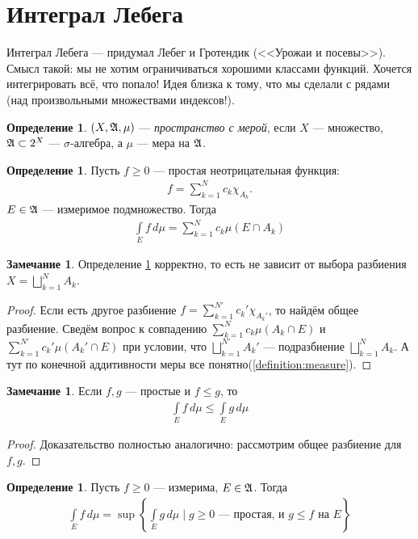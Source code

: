 \documentclass[a4paper,14pt]{extarticle}
\newcounter{theoremCnt}
\theoremstyle{definition}
\newtheorem{df}[theoremCnt]{Определение}
\theoremstyle{plain}
\theoremstyle{plain}
\theoremstyle{plain}
\theoremstyle{plain}
\theoremstyle{definition}
\theoremstyle{definition}
\newtheorem{remrk}[theoremCnt]{Замечание}
\theoremstyle{definition}
\theoremstyle{definition}
\theoremstyle{definition}
\theoremstyle{definition}
\theoremstyle{plain}
\theoremstyle{plain}
\theoremstyle{plain}
\theoremstyle{plain}
\theoremstyle{definition}
\theoremstyle{definition}
\theoremstyle{definition}
\theoremstyle{definition}
\theoremstyle{definition}
\newcommand{\A}{\ensuremath \mathfrak{A}}
\begin{document}
\section{Интеграл Лебега}

Интеграл Лебега --- придумал Лебег и Гротендик (<<Урожаи и посевы>>). Смысл такой: мы не хотим ограничиваться хорошими классами функций. Хочется интегрировать всё, что попало! Идея близка к тому, что мы сделали с рядами (над произвольными множествами индексов!).

\begin{df}
 $(X, \A, \mu)$ --- \textit{пространство с мерой}, если $X$ --- множество, $\A \subset 2^{X}$ --- $\sigma$-алгебра, а $\mu$ --- мера на $\A$.
\end{df}
\begin{df}
 \label{definition:integral_simple_positive}
 Пусть $f \geqslant 0$ --- простая неотрицательная функция: \begin{align*}
  f = \sum_{k=1}^{N} c_k \chi_{A_k}
 .\end{align*}  $E \in \A$ --- измеримое подмножество.  Тогда \begin{align*}
  \int\limits_{E} f \, d\mu = \sum_{k=1}^{N} c_k \mu (E \cap A_k)
 \end{align*} 
\end{df}
\begin{remrk}
 Определение \ref{definition:integral_simple_positive} корректно, то есть не зависит от выбора разбиения $X = \bigsqcup_{k=1}^{N} A_k$.
\end{remrk}
\begin{proof}
	Если есть другое разбиение $f = \sum_{k=1}^{N'} c_k' \chi_{A_k'}$, то найдём общее разбиение.
	Сведём вопрос к совпадению $\sum_{k=1}^{N} c_k \mu (A_k \cap E)$ и $\sum_{k=1}^{N'} c_k' \mu (A_k' \cap E)$ при условии, что $\bigsqcup_{k=1}^{N'} A_k' $ --- подразбиение $\bigsqcup_{k=1}^{N} A_k$.
	А тут по конечной аддитивности меры все понятно(\ref{definition:measure}).
\end{proof}
\begin{remrk}
 Если $f,g$ --- простые и $f \leqslant g$, то \begin{align*}
  \int\limits_E f \, d\mu \leqslant \int\limits_E g\, d\mu
 \end{align*} 
\end{remrk}
\begin{proof}
 Доказательство полностью аналогично: рассмотрим общее разбиение для $f,g$.
\end{proof}
\begin{df}
	\label{definition:integral_supremum_simple}
 Пусть $f \geqslant 0$ --- измерима, $E \in \A$. Тогда \begin{align*}
  \int\limits_E f \, d\mu = \sup \left\{ \int\limits_E g\, d\mu \mid g \geqslant 0 \text{ --- простая, и } g \leqslant f \text{ на } E \right\}
 \end{align*} 
\end{df}
\end{document}
